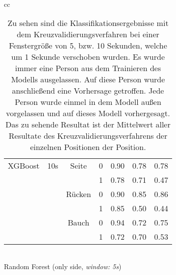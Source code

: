 \begin{table}
\begin{tabular} {cc}
\begin{minipage}{1\linewidth}
\begin{center}
\begin{tabular}{ | l | c | c | c | c | c | r | }
            \hline
            XGBoost & 10s & Seite & 0 & 0.90 & 0.78 & 0.78 \\
                    &     &       & 1 & 0.78 & 0.71 & 0.47 \\ \hline
                    &     & Rücken& 0 & 0.90 & 0.85 & 0.86 \\
                    &     &       & 1 & 0.85 & 0.50 & 0.44 \\ \hline
                    &     & Bauch & 0 & 0.94 & 0.72 & 0.75 \\
                    &     &       & 1 & 0.72 & 0.70 & 0.53 \\ \hline
          \end{tabular}
          \smallskip
          \\ Random Forest (only side, \textit{window: 5s})
      \end{center}
  \end{minipage} 
    
  \end{tabular}
  \caption{Zu sehen sind die Klassifikationsergebnisse mit dem Kreuzvalidierungsverfahren bei einer Fenstergröße von 5, bzw. 10 Sekunden, welche um 1 Sekunde verschoben wurden. Es wurde immer eine Person aus dem Trainieren des Modells ausgelassen. Auf diese Person wurde anschließend eine Vorhersage getroffen. Jede Person wurde einmel in dem Modell außen vorgelassen und auf dieses Modell vorhergesagt. Das zu sehende Resultat ist der Mittelwert aller Resultate des Kreuzvalidierungsverfahrens der einzelnen Positionen der Position.}
  \label{evaluation:loso_classification_results}  
\end{table}


